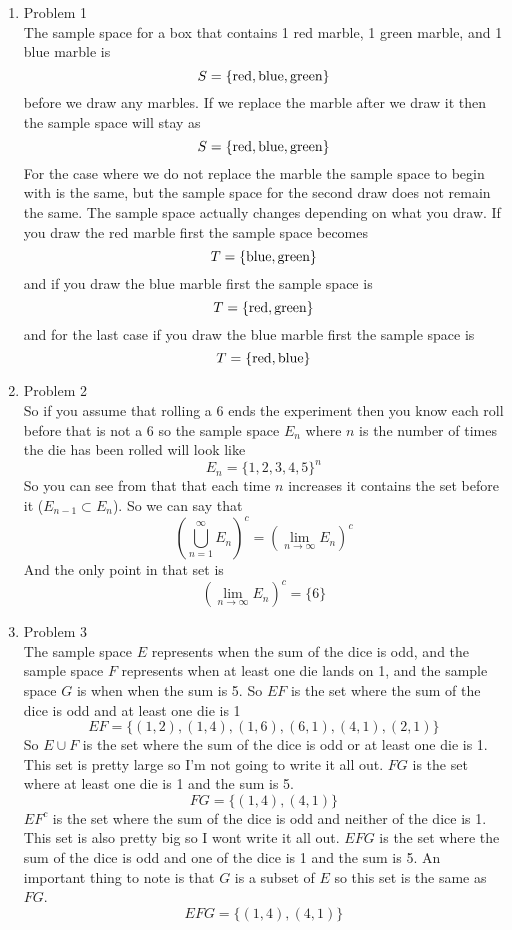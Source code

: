 \documentclass[11pt]{article}
\begin{document}

\begin{enumerate}
\item Problem 1 \\
The sample space for a box that contains 1 red marble, 1 green marble, and 1 blue marble is $$S = \{\textnormal{red},\textnormal{blue},\textnormal{green}\}$$ before we draw any marbles. If we replace the marble after we draw it then the sample space will stay as $$S = \{\textnormal{red},\textnormal{blue},\textnormal{green}\}$$
For the case where we do not replace the marble the sample space to begin with is the same, but the sample space for the second draw does not remain the same. The sample space actually changes depending on what you draw. If you draw the red marble first the sample space becomes
$$T = \{\textnormal{blue},\textnormal{green}\}$$
and if you draw the blue marble first the sample space is
$$T = \{\textnormal{red},\textnormal{green}\}$$
and for the last case if you draw the blue marble first the sample space is
$$T = \{\textnormal{red},\textnormal{blue}\}$$

\item Problem 2 \\
So if you assume that rolling a 6 ends the experiment then you know each roll before that is not a 6 so the sample space $E_n$ where $n$ is the number of times the die has been rolled will look like
$$E_n = \{1,2,3,4,5\}^n$$
So you can see from that that each time $n$ increases it contains the set before it ($E_{n-1} \subset E_n$). 
So we can say that
$$\left(\bigcup_{n=1}^{\infty} E_n\right)^c = (\lim_{n \rightarrow \infty} E_n)^c$$
And the only point in that set is 
$$(\lim_{n \rightarrow \infty} E_n)^c = \{6\}$$

\item Problem 3 \\
The sample space $E$ represents when the sum of the dice is odd, and the sample space $F$ represents when at least one die lands on 1, and the sample space $G$ is when when the sum is 5. 
So $EF$ is the set where the sum of the dice is odd and at least one die is 1
$$EF = \{(1,2),(1,4),(1,6),(6,1),(4,1),(2,1)\}$$
So $E\cup F$ is the set where the sum of the dice is odd or at least one die is 1. This set is pretty large so I'm not going to write it all out.
$FG$ is the set where at least one die is 1 and the sum is 5.
$$FG = \{(1,4),(4,1)\}$$
$EF^c$ is the set where the sum of the dice is odd and neither of the dice is 1. This set is also pretty big so I wont write it all out.
$EFG$ is the set where the sum of the dice is odd and one of the dice is 1 and the sum is 5. An important thing to note is that $G$ is a subset of $E$ so this set is the same as $FG$.
$$EFG = \{(1,4),(4,1)\}$$


\end{enumerate}
\end{document}

